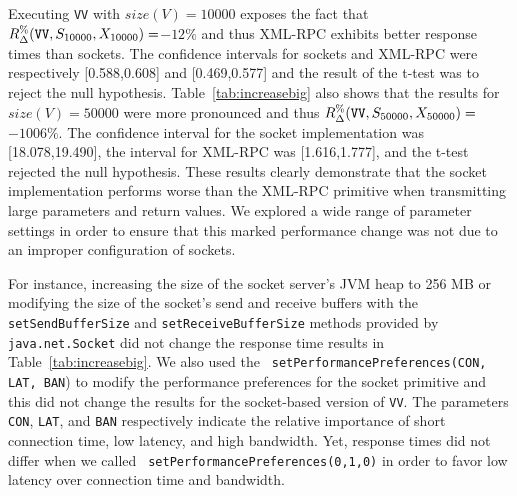 \documentclass{sig-alternate}
\begin{document}


Executing {\tt VV} with $size(V)=10000$ exposes the fact that
{\small$R_\Delta^\%(\mbox{{\tt VV}},S_{10000},X_{10000})=$}$-12\%$ and
thus XML-RPC exhibits better response times than sockets.  The
confidence intervals for sockets and XML-RPC were respectively
[0.588,0.608] and [0.469,0.577] and the result of the t-test was to
reject the null hypothesis.  Table~\ref{tab:increasebig} also shows
that the results for $size(V)=50000$ were more pronounced and thus
{\small$R_\Delta^\%(\mbox{{\tt VV}},S_{50000},X_{50000})=$}$-1006\%$.
The confidence interval for the socket implementation was
[18.078,19.490], the interval for XML-RPC was [1.616,1.777], and the
t-test rejected the null hypothesis.  These results clearly
demonstrate that the socket implementation performs worse than the
XML-RPC primitive when transmitting large parameters and return
values.  We explored a wide range of parameter settings in order to
ensure that this marked performance change was not due to an improper
configuration of sockets.




For instance, increasing the size of the socket server's JVM heap to
256 MB or modifying the size of the socket's send and receive buffers
with the {\tt setSendBufferSize} and {\tt setReceiveBufferSize}
methods provided by {\tt java.net.Socket} did not change the response
time results in Table~\ref{tab:increasebig}.  We also used the {\tt
  setPerformancePreferences(CON, LAT, BAN}) to modify the performance
preferences for the socket primitive and this did not change the
results for the socket-based version of {\tt VV}.  The parameters {\tt
  CON}, {\tt LAT}, and {\tt BAN} respectively indicate the relative
importance of short connection time, low latency, and high bandwidth.
Yet, response times did not differ when we called {\tt
  setPerformancePreferences(0,1,0)} in order to favor low latency over
connection time and bandwidth.
\end{document}
